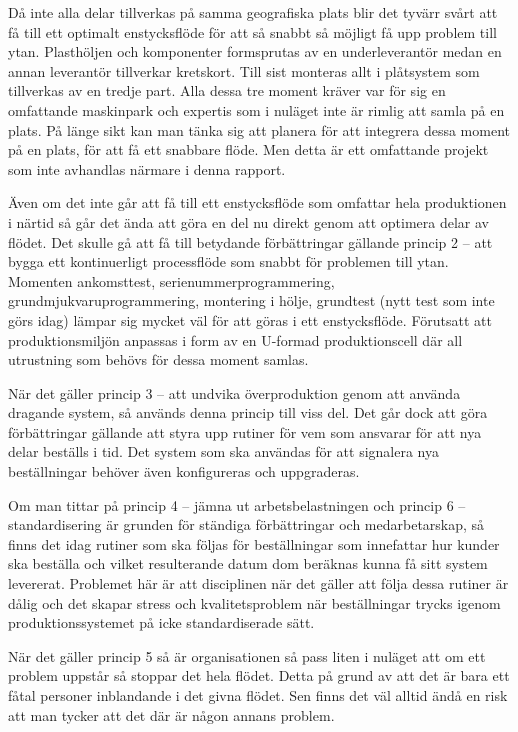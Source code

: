 \documentclass{article}
\begin{document}
Då inte alla delar tillverkas på samma geografiska plats blir det tyvärr svårt att få till ett optimalt enstycksflöde för att så snabbt så möjligt få upp problem till ytan. Plasthöljen och komponenter formsprutas av en underleverantör medan en annan leverantör tillverkar kretskort. Till sist monteras allt i plåtsystem som tillverkas av en tredje part. Alla dessa tre moment kräver var för sig en omfattande maskinpark och expertis som i nuläget inte är rimlig att samla på en plats. På länge sikt kan man tänka sig att planera för att integrera dessa moment på en plats, för att få ett snabbare flöde. Men detta är ett omfattande projekt som inte avhandlas närmare i denna rapport. 
 
Även om det inte går att få till ett enstycksflöde som omfattar hela produktionen i närtid så går det ända att göra en del nu direkt genom att optimera delar av flödet. Det skulle gå att få till betydande förbättringar gällande princip 2 -- att bygga ett kontinuerligt processflöde som snabbt för problemen till ytan. Momenten ankomsttest, serienummerprogrammering, grundmjukvaruprogrammering, montering i hölje, grundtest (nytt test som inte görs idag) lämpar sig mycket väl för att göras i ett enstycksflöde. Förutsatt att produktionsmiljön anpassas i form av en U-formad produktionscell där all utrustning som behövs för dessa moment samlas.

När det gäller princip 3 -- att undvika överproduktion genom att använda dragande system, så används denna princip till viss del. Det går dock att göra förbättringar gällande att styra upp rutiner för vem som ansvarar för att nya delar beställs i tid. Det system som ska användas för att signalera nya beställningar behöver även konfigureras och uppgraderas.

Om man tittar på princip 4 -- jämna ut arbetsbelastningen och princip 6 -- standardisering är grunden för ständiga förbättringar och medarbetarskap, så finns det idag rutiner som ska följas för beställningar som innefattar hur kunder ska beställa och vilket resulterande datum dom beräknas kunna få sitt system levererat. Problemet här är att disciplinen när det gäller att följa dessa rutiner är dålig och det skapar stress och kvalitetsproblem när beställningar trycks igenom produktionssystemet på icke standardiserade sätt.

När det gäller princip 5 så är organisationen så pass liten i nuläget att om ett problem uppstår så stoppar det hela flödet. Detta på grund av att det är bara ett fåtal personer inblandande i det givna flödet. Sen finns det väl alltid ändå en risk att man tycker att det där är någon annans problem.
\end{document}
